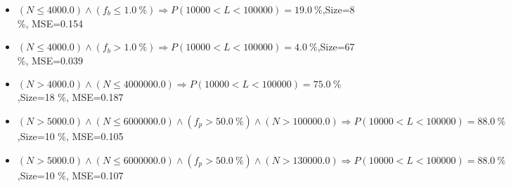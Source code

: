 \documentclass[numbered]{CSL}
\begin{document}
\begin{itemize}
\item $(N \leq 4000.0) \land (f_b \leq 1.0~\%) \Rightarrow P(10 000 < L < 100 000) = 19.0~\%$,\hfill Size=8 \%, MSE=0.154
\item $(N \leq 4000.0) \land (f_b > 1.0~\%) \Rightarrow P(10 000 < L < 100 000) = 4.0~\%$,\hfill Size=67 \%, MSE=0.039
\item $(N > 4000.0) \land (N \leq 4000000.0) \Rightarrow P(10 000 < L < 100 000) = 75.0~\%$,\hfill Size=18 \%, MSE=0.187
\item $(N > 5000.0) \land (N \leq 6000000.0) \land (f_p > 50.0~\%) \land (N > 100000.0) \Rightarrow P(10 000 < L < 100 000) = 88.0~\%$,\hfill Size=10 \%, MSE=0.105
\item $(N > 5000.0) \land (N \leq 6000000.0) \land (f_p > 50.0~\%) \land (N > 130000.0) \Rightarrow P(10 000 < L < 100 000) = 88.0~\%$,\hfill Size=10 \%, MSE=0.107
\end{itemize}
\end{document}
